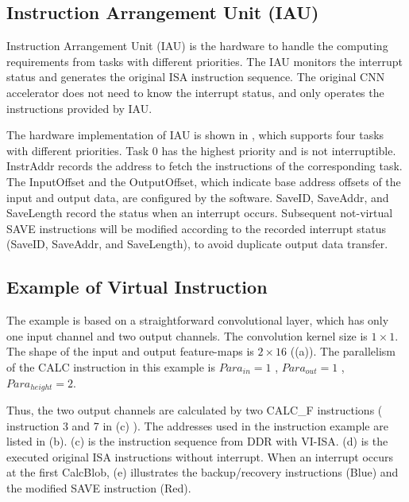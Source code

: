 \subsection{ Instruction Arrangement Unit (IAU) }

Instruction Arrangement Unit (IAU) is the hardware to handle the computing requirements from tasks with different priorities. The IAU monitors the interrupt status and generates the original ISA instruction sequence. The original CNN accelerator does not need to know the interrupt status, and only operates the instructions provided by IAU.

The hardware implementation of IAU is shown in , which supports four tasks with different priorities. Task 0 has the highest priority and is not interruptible. 
InstrAddr records the address to fetch the instructions of the corresponding task. The InputOffset and the OutputOffset, which indicate base address offsets of the input and output data, are configured by the software. 
SaveID, SaveAddr, and SaveLength record the status when an interrupt occurs. 
Subsequent not-virtual SAVE instructions will be modified according to the recorded interrupt status (SaveID, SaveAddr, and SaveLength), to avoid duplicate output data transfer.


\subsection{Example of Virtual Instruction}
\label{sec:exampleVirtual}


The example is based on a straightforward convolutional layer, which has only one input channel and two output channels. 
The convolution kernel size is $1 \times 1$. The shape of the input and output feature-maps is $ 2 \times 16 $ ((a)). The parallelism of the CALC instruction in this example is $ Para_{in} = 1$ , $ Para_{out}=1$ , $Para_{height}=2$.

Thus, the two output channels are calculated by two CALC\_F instructions ( instruction 3 and 7 in (c) ). The addresses used in the instruction example are listed in (b). (c) is the instruction sequence from DDR with VI-ISA. (d) is the executed original ISA instructions without interrupt. When an interrupt occurs at the first CalcBlob, (e) illustrates the backup/recovery instructions (Blue) and the modified SAVE instruction (Red). 

